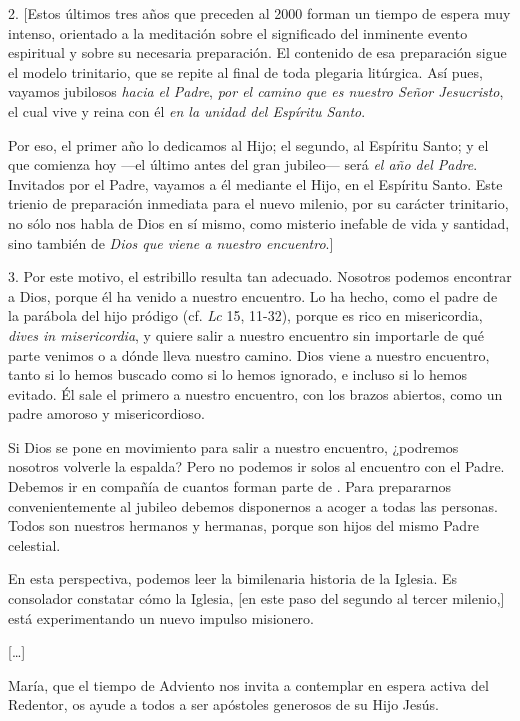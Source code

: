 \begin{body}
	2. {[}Estos últimos tres años que preceden al 2000 forman un tiempo de espera muy intenso, orientado a la meditación sobre el significado del inminente evento espiritual y sobre su necesaria preparación. El contenido de esa preparación sigue el modelo trinitario, que se repite al final de toda plegaria litúrgica. Así pues, vayamos jubilosos \emph{hacia el Padre}, \emph{por el camino que es nuestro Señor Jesucristo}, el cual vive y reina con él \emph{en la unidad del Espíritu Santo}. 
	
	Por eso, el primer año lo dedicamos al Hijo; el segundo, al Espíritu Santo; y el que comienza hoy ---el último antes del gran jubileo--- será \emph{el año del Padre}. Invitados por el Padre, vayamos a él mediante el Hijo, en el Espíritu Santo. Este trienio de preparación inmediata para el nuevo milenio, por su carácter trinitario, no sólo nos habla de Dios en sí mismo, como misterio inefable de vida y santidad, sino también de \emph{Dios que viene a nuestro encuentro}.{]} 
	
	3. Por este motivo, el estribillo  resulta tan adecuado. Nosotros podemos encontrar a Dios, porque él ha venido a nuestro encuentro. Lo ha hecho, como el padre de la parábola del hijo pródigo (cf. \emph{Lc} 15, 11-32), porque es rico en misericordia, \emph{dives in misericordia}, y quiere salir a nuestro encuentro sin importarle de qué parte venimos o a dónde lleva nuestro camino. Dios viene a nuestro encuentro, tanto si lo hemos buscado como si lo hemos ignorado, e incluso si lo hemos evitado. Él sale el primero a nuestro encuentro, con los brazos abiertos, como un padre amoroso y misericordioso. 
	
	Si Dios se pone en movimiento para salir a nuestro encuentro, ¿podremos nosotros volverle la espalda? Pero no podemos ir solos al encuentro con el Padre. Debemos ir en compañía de cuantos forman parte de . Para prepararnos convenientemente al jubileo debemos disponernos a acoger a todas las personas. Todos son nuestros hermanos y hermanas, porque son hijos del mismo Padre celestial. 
	
	En esta perspectiva, podemos leer la bimilenaria historia de la Iglesia. Es consolador constatar cómo la Iglesia, {[}en este paso del segundo al tercer milenio,{]} está experimentando un nuevo impulso misionero. 
	
	[\ldots{}] 
	
	María, que el tiempo de Adviento nos invita a contemplar en espera activa del Redentor, os ayude a todos a ser apóstoles generosos de su Hijo Jesús. 
	

\end{body}
